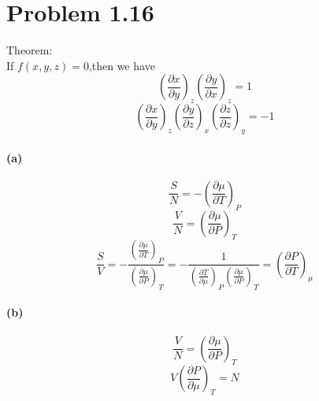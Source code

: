 \documentclass{article}
\begin{document}
\section*{Problem 1.16}
Theorem:\\
If $f(x,y,z)=0$,then we have
\[\left(\frac{\partial x}{\partial y}\right)_z \left(\frac{\partial y}{\partial x}\right)_z =1\]
\[\left(\frac{\partial x}{\partial y}\right)_z \left(\frac{\partial y}{\partial z}\right)_x \left(\frac{\partial z}{\partial z}\right)_y=-1\]
\paragraph{(a)}
\[\frac{S}{N}=-\left(\frac{\partial \mu }{\partial T}\right)_{P}\]
\[\frac{V}{N}=\left(\frac{\partial \mu }{\partial P}\right)_{T}\]
\[\frac{S}{V}=-\frac{\left(\frac{\partial \mu }{\partial T}\right)_{P}}{\left(\frac{\partial \mu }{\partial P}\right)_{T}}=
-\frac{1}{\left(\frac{\partial T}{\partial \mu }\right)_{P} \left(\frac{\partial \mu }{\partial P}\right)_{T}}=
\left(\frac{\partial P}{\partial T}\right)_{\mu }\]
\paragraph{(b)}
\[\frac{V}{N}=\left(\frac{\partial \mu }{\partial P}\right)_{T}\]
\[V \left (\frac{\partial P}{\partial \mu} \right )_{T}=N\]
\end{document}
